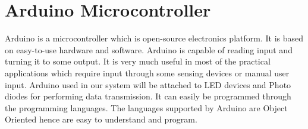 \documentclass{ijcaArticle}
\begin{document}
\section{Arduino Microcontroller}
Arduino is a microcontroller which is open-source electronics platform. It is based on easy-to-use hardware and software.
Arduino is capable of reading input and turning it to some output. It is very much useful in most of the practical applications which require input through some sensing devices or manual user input. Arduino used in our system will be attached to LED devices and Photo diodes for performing data transmission. It can easily be programmed through the programming languages. The languages supported by Arduino are Object Oriented hence are easy to understand and program.
\end{document}
